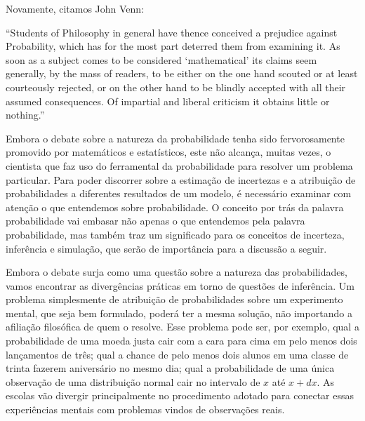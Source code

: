 Novamente, citamos John Venn:

``Students of Philosophy in general have thence conceived a prejudice against Probability, which has for the most part
deterred them from examining it. As soon as a subject comes to be considered `mathematical' its claims seem generally,
by the mass of readers, to be either on the one hand scouted or at least courteously rejected, or on the other hand
to be blindly accepted with all their assumed consequences. Of impartial and liberal criticism it obtains little or nothing.''
\citep{Venn1866}

Embora o debate sobre a natureza da probabilidade tenha sido fervorosamente promovido por matemáticos e estatísticos,
este não alcança, muitas vezes, o cientista que faz uso do ferramental da probabilidade para resolver um problema particular.
Para poder discorrer sobre a estimação de incertezas e a atribuição de probabilidades a diferentes resultados de um modelo,
é necessário examinar com atenção o que entendemos sobre probabilidade. O conceito por trás da palavra probabilidade vai
embasar não apenas o que entendemos pela palavra probabilidade, mas também traz um significado para os conceitos de
incerteza, inferência e simulação, que serão de importância para a discussão a seguir. 

Embora o debate surja como uma questão sobre a natureza das probabilidades, vamos encontrar as divergências práticas
em torno de questões de inferência. Um problema simplesmente de atribuição de probabilidades sobre um experimento mental,
que seja bem formulado, poderá ter a mesma solução, não importando a afiliação filosófica de quem o resolve. Esse problema 
pode ser, por exemplo, qual a probabilidade de uma moeda justa cair com a cara para cima em pelo menos dois lançamentos de 
três; qual a chance de pelo menos dois alunos em uma classe de trinta fazerem aniversário no mesmo dia; qual a probabilidade 
de uma única observação de uma distribuição normal cair no intervalo de $x$ até $x+dx$. As escolas vão divergir principalmente
no procedimento adotado para conectar essas experiências mentais com problemas vindos de observações reais. 

